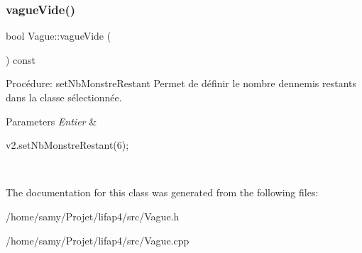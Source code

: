 \subsubsection{\texorpdfstring{vague\+Vide()}{vagueVide()}}
{\footnotesize\ttfamily bool Vague\+::vague\+Vide (\begin{DoxyParamCaption}{ }\end{DoxyParamCaption}) const}



Procédure\+: set\+Nb\+Monstre\+Restant Permet de définir le nombre d\textquotesingle{}ennemis restants dans la classe sélectionnée. 


\begin{DoxyParams}{Parameters}
{\em Entier} & 
\begin{DoxyCode}
v2.setNbMonstreRestant(6);
\end{DoxyCode}
 \\
\hline
\end{DoxyParams}


The documentation for this class was generated from the following files\+:\begin{DoxyCompactItemize}
\item 
/home/samy/\+Projet/lifap4/src/Vague.\+h\item 
/home/samy/\+Projet/lifap4/src/Vague.\+cpp\end{DoxyCompactItemize}
